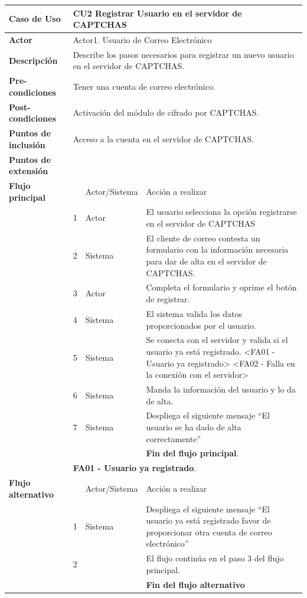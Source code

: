  \begin{longtable}[H]{| p{} | p{} |p{4cm}|p{5cm}|}%
     \hline
     \textbf{Caso de Uso} &\multicolumn{3}{|l|}{CU2 Registrar Usuario en el servidor de CAPTCHAS}\\
     \hline
     \textbf{Actor} & \multicolumn{3}{|l|}{Actor1. Usuario de Correo Electrónico}\\
     \hline
     \textbf{Descripción} & \multicolumn{3}{|p{10cm}|}{Describe los pasos necesarios para registrar un nuevo usuario en el servidor de CAPTCHAS.}\\
     \hline
     \textbf{Pre-condiciones} & \multicolumn{3}{|l|}{Tener una cuenta de correo electrónico.}\\
     \hline
     \textbf{Post-condiciones} & \multicolumn{3}{|l|}{Activación del módulo de cifrado por CAPTCHAS.}\\
     \hline
     \textbf{Puntos de inclusión} & \multicolumn{3}{|l|}{Acceso a la cuenta en el servidor de CAPTCHAS.}\\
     \hline
     \textbf{Puntos de extensión} & \multicolumn{3}{|l|}{}\\
     \hline
     \textbf{Flujo principal} & & Actor/Sistema & Acción a realizar\\
     \hline
     & 1 & Actor & El usuario selecciona la opción registrarse en el servidor de CAPTCHAS\\
     \hline
     & 2 & Sistema & El cliente de correo contesta un formulario con la información necesaria para dar de alta en el servidor de CAPTCHAS.\\
     \hline
     & 3 & Actor & Completa el formulario y oprime el botón de registrar.\\
     \hline
     & 4 & Sistema & El sistema valida los datos proporcionados por el usuario.\\
     \hline
     & 5 & Sistema & Se conecta con el servidor y valida si el usuario ya está registrado. <FA01 - Usuario ya registrado> <FA02 - Falla en la conexión con el servidor>\\
     \hline
     & 6 & Sistema & Manda la información del usuario y lo da de alta.\\
     \hline
     & 7 & Sistema & Despliega el siguiente mensaje ``El usuario se ha dado de alta correctamente''\\
     \hline
     & & & \textbf{Fin del flujo principal}.\\
     \hline
     & \multicolumn{3}{|l|}{\textbf{FA01 - Usuario ya registrado}.}\\
     \hline
     \textbf{Flujo alternativo} & & Actor/Sistema & Acción a realizar\\
     \hline
     & 1 & Sistema & Despliega el siguiente mensaje  ``El usuario ya está registrado favor de proporcionar otra cuenta de correo electrónico''\\
     \hline
     & 2 & & El flujo continúa en el paso 3 del flujo principal.\\
     \hline
     &  & & \textbf{Fin del flujo alternativo}\\
     \hline
     

\end{longtable}
